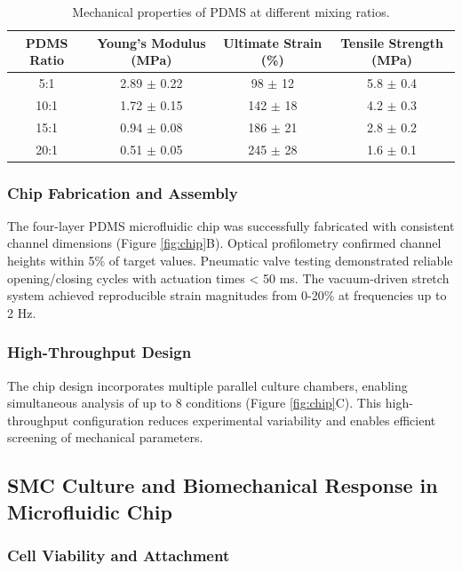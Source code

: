 \documentclass[materials,article,submit,moreauthors,pdftex]{Definitions/mdpi}
\begin{document}
\begin{table}[H]
\caption{Mechanical properties of PDMS at different mixing ratios.}
\label{tab:pdms}
\begin{tabular}{cccc}
\toprule
\textbf{PDMS Ratio} & \textbf{Young's Modulus (MPa)} & \textbf{Ultimate Strain (\%)} & \textbf{Tensile Strength (MPa)} \\
\midrule
5:1  & 2.89 $\pm$ 0.22 & 98 $\pm$ 12 & 5.8 $\pm$ 0.4 \\
10:1 & 1.72 $\pm$ 0.15 & 142 $\pm$ 18 & 4.2 $\pm$ 0.3 \\
15:1 & 0.94 $\pm$ 0.08 & 186 $\pm$ 21 & 2.8 $\pm$ 0.2 \\
20:1 & 0.51 $\pm$ 0.05 & 245 $\pm$ 28 & 1.6 $\pm$ 0.1 \\
\bottomrule
\end{tabular}
\end{table}

\subsubsection{Chip Fabrication and Assembly}

The four-layer PDMS microfluidic chip was successfully fabricated with consistent channel dimensions (Figure \ref{fig:chip}B). Optical profilometry confirmed channel heights within 5\% of target values. Pneumatic valve testing demonstrated reliable opening/closing cycles with actuation times < 50 ms. The vacuum-driven stretch system achieved reproducible strain magnitudes from 0-20\% at frequencies up to 2 Hz.

\subsubsection{High-Throughput Design}

The chip design incorporates multiple parallel culture chambers, enabling simultaneous analysis of up to 8 conditions (Figure \ref{fig:chip}C). This high-throughput configuration reduces experimental variability and enables efficient screening of mechanical parameters.

\subsection{SMC Culture and Biomechanical Response in Microfluidic Chip}

\subsubsection{Cell Viability and Attachment}
\end{document}
